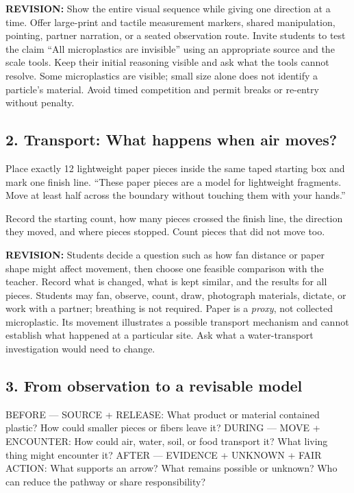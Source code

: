 \documentclass[11pt]{article}
\newcommand{\original}[1]{{\color{black}#1}}
\newcommand{\revision}[1]{{\color{Addition}\textbf{REVISION:} #1}}
\begin{document}
\revision{Show the entire visual sequence while giving one direction at a time. Offer large-print and tactile measurement markers, shared manipulation, pointing, partner narration, or a seated observation route. Invite students to test the claim ``All microplastics are invisible'' using an appropriate source and the scale tools. Keep their initial reasoning visible and ask what the tools cannot resolve. Some microplastics are visible; small size alone does not identify a particle's material. Avoid timed competition and permit breaks or re-entry without penalty.}

\subsection*{2. Transport: What happens when air moves?}
\original{Place exactly 12 lightweight paper pieces inside the same taped starting box and mark one finish line. ``These paper pieces are a model for lightweight fragments. Move at least half across the boundary without touching them with your hands.''}

\original{Record the starting count, how many pieces crossed the finish line, the direction they moved, and where pieces stopped. Count pieces that did not move too.}

\revision{Students decide a question such as how fan distance or paper shape might affect movement, then choose one feasible comparison with the teacher. Record what is changed, what is kept similar, and the results for all pieces. Students may fan, observe, count, draw, photograph materials, dictate, or work with a partner; breathing is not required. Paper is a \emph{proxy}, not collected microplastic. Its movement illustrates a possible transport mechanism and cannot establish what happened at a particular site. Ask what a water-transport investigation would need to change.}

\subsection*{3. From observation to a revisable model}
\original{BEFORE --- SOURCE + RELEASE: What product or material contained plastic? How could smaller pieces or fibers leave it? DURING --- MOVE + ENCOUNTER: How could air, water, soil, or food transport it? What living thing might encounter it? AFTER --- EVIDENCE + UNKNOWN + FAIR ACTION: What supports an arrow? What remains possible or unknown? Who can reduce the pathway or share responsibility?}
\end{document}
